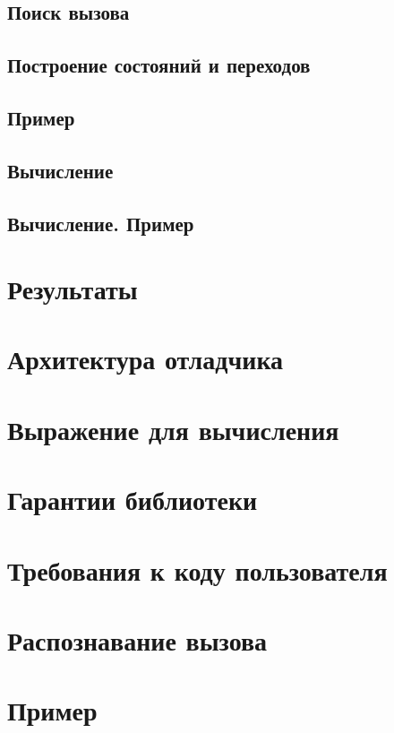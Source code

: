\subsection{Поиск вызова}

\subsection{Построение состояний и переходов}

\subsection{Пример}

\subsection{Вычисление}

\subsection{Вычисление. Пример}


\section{Результаты}



\appendix
\section{Архитектура отладчика}

\section{Выражение для вычисления}

\section{Гарантии библиотеки}

\section{Требования к коду пользователя}

\section{Распознавание вызова}


\section{Пример}


